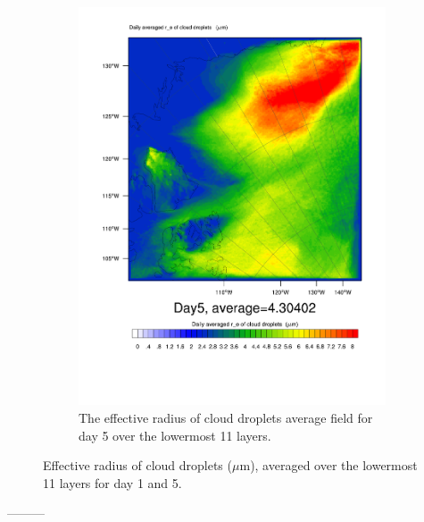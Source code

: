 \begin{figure}[h]
\begin{subfigure}{0.48\textwidth}
		\includegraphics[width=\textwidth]{results/control/RE_CLOUD_Day5.pdf}
		\caption{The effective radius of cloud droplets average field for day 5 over the lowermost 11 layers.}
		\label{subfig:recloud_r1Day5}
	\end{subfigure}
	\caption{Effective radius of cloud droplets ($\mu\text{m}$), averaged over the lowermost 11 layers for day 1 and 5.}
	\label{fig:recloud_r1}
\end{figure}


---------


